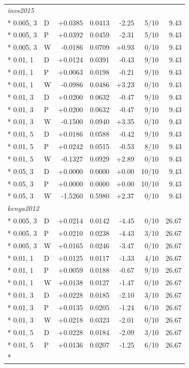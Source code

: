 \begin{longtable}{llrrrrr}
\multicolumn{7}{l}{\textit{invs2015}}\\*
0.005, 3 & D & +0.0385 & 0.0413 & -2.25 & 5/10 & 9.43\\*
0.005, 3 & P & +0.0392 & 0.0459 & -2.31 & 5/10 & 9.43\\*
0.005, 3 & W & -0.0186 & 0.0709 & +0.93 & 0/10 & 9.43\\*
0.01, 1 & D & +0.0124 & 0.0391 & -0.43 & 9/10 & 9.43\\*
0.01, 1 & P & +0.0063 & 0.0198 & -0.21 & 9/10 & 9.43\\*
0.01, 1 & W & -0.0986 & 0.0486 & +3.23 & 0/10 & 9.43\\*
0.01, 3 & D & +0.0200 & 0.0632 & -0.47 & 9/10 & 9.43\\*
0.01, 3 & P & +0.0200 & 0.0632 & -0.47 & 9/10 & 9.43\\*
0.01, 3 & W & -0.1500 & 0.0940 & +3.35 & 0/10 & 9.43\\*
0.01, 5 & D & +0.0186 & 0.0588 & -0.42 & 9/10 & 9.43\\*
0.01, 5 & P & +0.0242 & 0.0515 & -0.53 & 8/10 & 9.43\\*
0.01, 5 & W & -0.1327 & 0.0929 & +2.89 & 0/10 & 9.43\\*
0.05, 3 & D & +0.0000 & 0.0000 & +0.00 & 10/10 & 9.43\\*
0.05, 3 & P & +0.0000 & 0.0000 & +0.00 & 10/10 & 9.43\\*
0.05, 3 & W & -1.5260 & 0.5980 & +2.37 & 0/10 & 9.43\\
\multicolumn{7}{l}{\textit{kenya2012}}\\*
0.005, 3 & D & +0.0214 & 0.0142 & -4.45 & 0/10 & 26.67\\*
0.005, 3 & P & +0.0210 & 0.0238 & -4.43 & 3/10 & 26.67\\*
0.005, 3 & W & +0.0165 & 0.0246 & -3.47 & 0/10 & 26.67\\*
0.01, 1 & D & +0.0125 & 0.0117 & -1.33 & 4/10 & 26.67\\*
0.01, 1 & P & +0.0059 & 0.0188 & -0.67 & 9/10 & 26.67\\*
0.01, 1 & W & +0.0138 & 0.0127 & -1.47 & 0/10 & 26.67\\*
0.01, 3 & D & +0.0228 & 0.0185 & -2.10 & 3/10 & 26.67\\*
0.01, 3 & P & +0.0135 & 0.0205 & -1.24 & 6/10 & 26.67\\*
0.01, 3 & W & +0.0218 & 0.0323 & -2.01 & 0/10 & 26.67\\*
0.01, 5 & D & +0.0228 & 0.0184 & -2.09 & 3/10 & 26.67\\*
0.01, 5 & P & +0.0136 & 0.0207 & -1.25 & 6/10 & 26.67\\*

\end{longtable}
